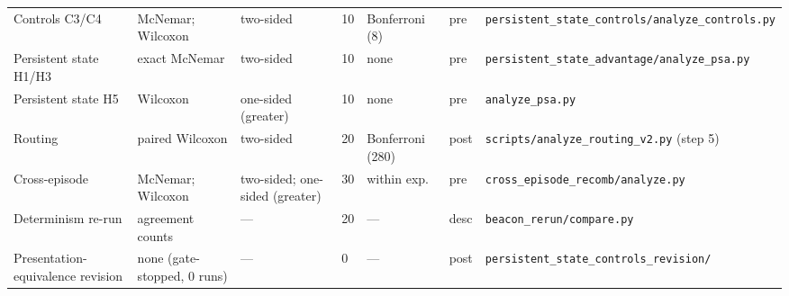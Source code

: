 \documentclass[10pt,a4paper]{article}
\begin{document}
\begin{table}[h]
\begin{tabular}{L{2.5cm}L{2.5cm}L{2.4cm}L{0.7cm}L{1.8cm}L{0.7cm}L{3.4cm}}
Controls C3/C4 & McNemar; Wilcoxon & two-sided & 10 & Bonferroni (8) & pre & \texttt{persistent\_state\_\allowbreak controls/analyze\_controls.py} \\
Persistent state H1/H3 & exact McNemar & two-sided & 10 & none & pre & \texttt{persistent\_state\_\allowbreak advantage/analyze\_psa.py} \\
Persistent state H5 & Wilcoxon & one-sided (greater) & 10 & none & pre & \texttt{analyze\_psa.py} \\
Routing & paired Wilcoxon & two-sided & 20 & Bonferroni (280) & post & \texttt{scripts/analyze\_routing\_v2.py} (step 5) \\
Cross-episode & McNemar; Wilcoxon & two-sided; one-sided (greater) & 30 & within exp. & pre & \texttt{cross\_episode\_\allowbreak recomb/analyze.py} \\
Determinism re-run & agreement counts & --- & 20 & --- & desc & \texttt{beacon\_rerun/compare.py} \\
Presentation-equivalence revision & none (gate-stopped, 0 runs) & --- & 0 & --- & post & \texttt{persistent\_state\_\allowbreak controls\_\allowbreak revision/} \\
\bottomrule
\end{tabular}
\end{table}
\end{document}
